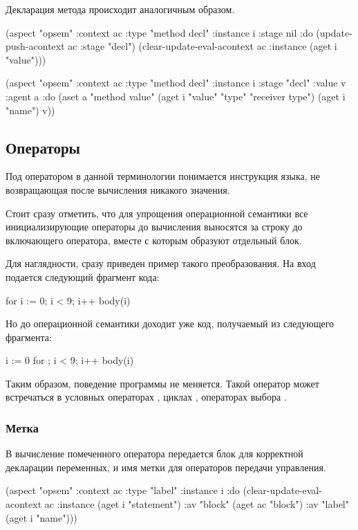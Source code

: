 \documentclass[12pt,twoside,russian]{article}
\newcommand{\textGoKeyword}[1]{{\color{goPurple}\textbf{#1}}}
\newcommand{\GoKeyword}[1]{\goinline{\textGoKeyword{#1}}}
\begin{document}
Декларация метода происходит аналогичным образом.

\begin{ABMLCode}
(aspect "opsem" :context ac :type "method decl" :instance i 
  :stage nil :do 
  (update-push-acontext ac :stage "decl")
  (clear-update-eval-acontext ac :instance (aget i "value")))
    
(aspect "opsem" :context ac :type "method decl" :instance i 
  :stage "decl" :value v :agent a :do 
  (aset a "method value" (aget i "value" "type" "receiver type") 
    (aget i "name") v))
\end{ABMLCode}


\subsection{Операторы}
Под оператором в данной терминологии понимается инструкция языка, не возвращающая после вычисления никакого значения.

Стоит сразу отметить, что для упрощения операционной семантики все инициализирующие операторы до вычисления выносятся за строку до включающего оператора, вместе с которым образуют отдельный блок. 

Для наглядности, сразу приведен пример такого преобразования. На вход подается следующий фрагмент кода:
\begin{GoCode}
for i := 0; i < 9; i++ { body(i) }
\end{GoCode}

Но до операционной семантики доходит уже код, получаемый из следующего фрагмента:
\begin{GoCode}
{
  i := 0
  for ; i < 9; i++ { body(i) }
}
\end{GoCode}

Таким образом, поведение программы не меняется. Такой оператор может встречаться в условных операторах \GoKeyword{if}, циклах \GoKeyword{for}, операторах выбора \GoKeyword{switch}.

\subsubsection{Метка}
В вычисление помеченного оператора передается блок для корректной декларации переменных, и имя метки для операторов передачи управления.

\begin{ABMLCode}
(aspect "opsem" :context ac :type "label" :instance i :do 
  (clear-update-eval-acontext ac :instance (aget i "statement") 
    :av "block" (aget ac "block") :av "label" (aget i "name")))
\end{ABMLCode}
\end{document}
